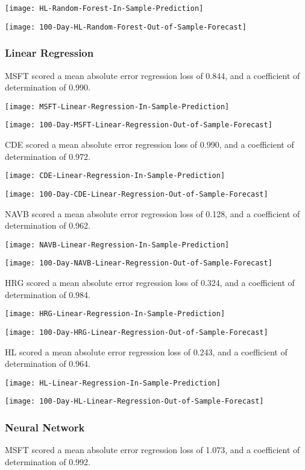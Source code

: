 \texttt{[image: HL-Random-Forest-In-Sample-Prediction]}

\texttt{[image: 100-Day-HL-Random-Forest-Out-of-Sample-Forecast]}

\subsubsection{Linear Regression}
MSFT scored a mean absolute error regression loss of 0.844, and a coefficient of determination of 0.990.

\texttt{[image: MSFT-Linear-Regression-In-Sample-Prediction]}

\texttt{[image: 100-Day-MSFT-Linear-Regression-Out-of-Sample-Forecast]}

CDE scored a mean absolute error regression loss of 0.990, and a coefficient of determination of 0.972.

\texttt{[image: CDE-Linear-Regression-In-Sample-Prediction]}

\texttt{[image: 100-Day-CDE-Linear-Regression-Out-of-Sample-Forecast]}

NAVB scored a mean absolute error regression loss of 0.128, and a coefficient of determination of 0.962.

\texttt{[image: NAVB-Linear-Regression-In-Sample-Prediction]}

\texttt{[image: 100-Day-NAVB-Linear-Regression-Out-of-Sample-Forecast]}

HRG scored a mean absolute error regression loss of 0.324, and a coefficient of determination of 0.984.

\texttt{[image: HRG-Linear-Regression-In-Sample-Prediction]}

\texttt{[image: 100-Day-HRG-Linear-Regression-Out-of-Sample-Forecast]}

HL scored a mean absolute error regression loss of 0.243, and a coefficient of determination of 0.964.

\texttt{[image: HL-Linear-Regression-In-Sample-Prediction]}

\texttt{[image: 100-Day-HL-Linear-Regression-Out-of-Sample-Forecast]}

\subsubsection{Neural Network}
MSFT scored a mean absolute error regression loss of 1.073, and a coefficient of determination of 0.992.

